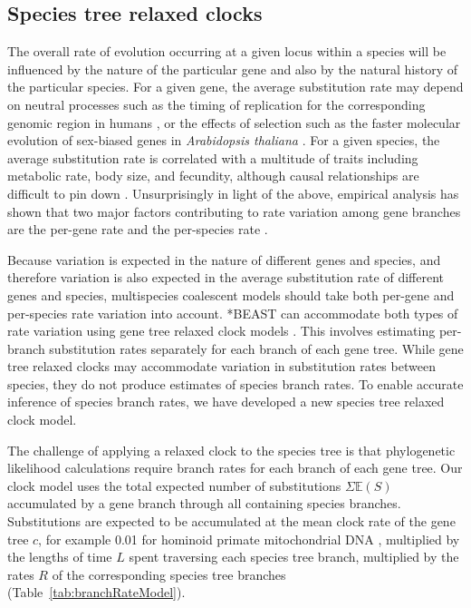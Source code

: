 \documentclass[12pt]{article}
\begin{document}
\subsection{Species tree relaxed clocks}

The overall rate of evolution occurring at a given locus within a species will
be influenced by the nature of the particular gene and also by the natural
history of the particular species. For a given gene, the average substitution
rate may depend on neutral processes such as the timing of replication for the
corresponding genomic region in humans \citep{Stamatoyannopoulos2009}, or the
effects of selection such as the faster molecular evolution of sex-biased genes
in \textit{Arabidopsis thaliana} \citep{Gossmann01032014}. For a given species,
the average substitution rate is correlated with a multitude of traits including
metabolic rate, body size, and fecundity, although causal relationships are
difficult to pin down \citep{Bromham2503}. Unsurprisingly in light of the above, empirical analysis
has shown that two major factors contributing to rate variation among gene
branches are the per-gene rate and the per-species rate
\citep{Rasmussen01122007}.

Because variation is expected in the nature of different genes and species, and
therefore variation is also expected in the average substitution rate of different
genes and species, multispecies coalescent models should take both per-gene and
per-species rate variation into account. *BEAST can accommodate both types of
rate variation using gene tree relaxed clock models \citep[for examples see][]{Berv2014120, Lambert2015146}.
This involves estimating per-branch substitution rates separately
for each branch of each gene tree. While gene tree relaxed clocks may
accommodate variation in substitution rates between species, they do not produce
estimates of species branch rates. To enable accurate inference of species
branch rates, we have developed a new species tree relaxed clock model.

The challenge of applying a relaxed clock to the species tree is that
phylogenetic likelihood calculations require branch rates for each branch of
each gene tree. Our clock model uses the total expected number of substitutions
$\Sigma \mathbb{E}(S)$ accumulated by a gene branch through all containing
species branches. Substitutions are expected to be accumulated at the mean
clock rate of the gene tree $c$, for example 0.01 for hominoid primate
mitochondrial DNA \citep{doi:10.1146/annurev.es.18.110187.001413}, multiplied
by the lengths of time $L$ spent traversing each species tree branch, multiplied
by the rates $R$ of the corresponding species tree branches
(Table~\ref{tab:branchRateModel}).
\end{document}
